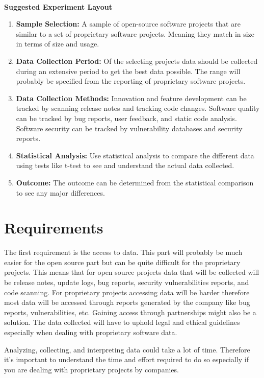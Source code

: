 \documentclass{article}
\begin{document}
\noindent \textbf{\\Suggested Experiment Layout}
\begin{enumerate}
    \item \textbf{Sample Selection:} A sample of open-source software projects that are similar to a set of proprietary software projects. Meaning they match in size in terms of size and usage.
    \item \textbf{Data Collection Period:} Of the selecting projects data should be collected during an extensive period to get the best data possible. The range will probably be specified from the reporting of proprietary software projects.
    \item \textbf{Data Collection Methods:} Innovation and feature development can be tracked by scanning release notes and tracking code changes. Software quality can be tracked by bug reports, user feedback, and static code analysis. Software security can be tracked by vulnerability databases and security reports.
    \item \textbf{Statistical Analysis:} Use statistical analysis to compare the different data using tests like t-test to see and understand the actual data collected.
    \item \textbf{Outcome:} The outcome can be determined from the statistical comparison to see any major differences.
\end{enumerate}

\section{Requirements}
The first requirement is the access to data. This part will probably be much easier for the open source part but can be quite difficult for the proprietary projects. This means that for open source projects data that will be collected will be release notes, update logs, bug reports, security vulnerabilities reports, and code scanning. For proprietary projects accessing data will be harder therefore most data will be accessed through reports generated by the company like bug reports, vulnerabilities, etc. Gaining access through partnerships might also be a solution. The data collected will have to uphold legal and ethical guidelines especially when dealing with proprietary software data.

Analyzing, collecting, and interpreting data could take a lot of time. Therefore it's important to understand the time and effort required to do so especially if you are dealing with proprietary projects by companies.
\end{document}
